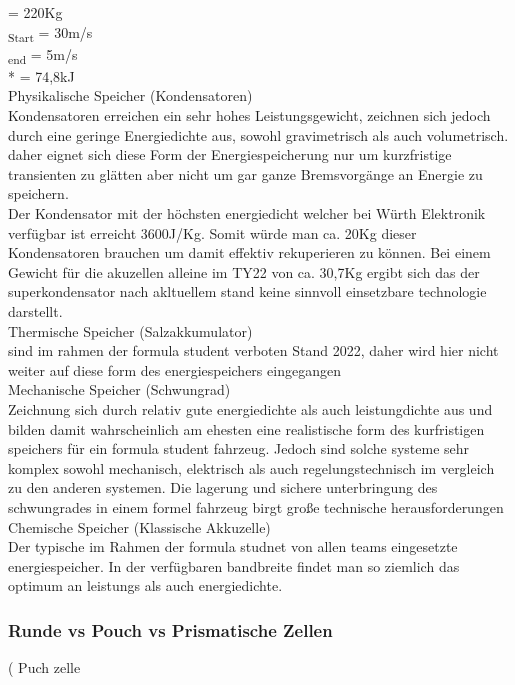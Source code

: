  = 220Kg
\\
\textsubscript{Start} = 30m/s
\\
\textsubscript{end} = 5m/s
\\
 *  = 74,8kJ
\\

Physikalische Speicher (Kondensatoren)
\\
	Kondensatoren erreichen ein sehr hohes Leistungsgewicht, zeichnen sich jedoch durch eine geringe Energiedichte aus, sowohl gravimetrisch als auch volumetrisch. daher eignet sich diese Form der Energiespeicherung nur um kurzfristige transienten zu glätten aber nicht um gar ganze Bremsvorgänge an Energie zu speichern.\\
	Der Kondensator mit der höchsten energiedicht welcher bei Würth Elektronik verfügbar ist erreicht 3600J/Kg. Somit würde man ca. 20Kg dieser Kondensatoren brauchen um damit effektiv rekuperieren zu können. Bei einem Gewicht für die akuzellen alleine im TY22 von ca. 30,7Kg ergibt sich das der superkondensator nach akltuellem stand keine sinnvoll einsetzbare technologie darstellt.
\\
Thermische Speicher (Salzakkumulator)
\\
	sind im rahmen der formula student verboten Stand 2022, daher wird hier nicht weiter auf diese form des energiespeichers eingegangen
\\
Mechanische Speicher (Schwungrad)
\\
	Zeichnung sich durch relativ gute energiedichte als auch leistungdichte aus und bilden damit wahrscheinlich am ehesten eine realistische form des kurfristigen speichers für ein formula student fahrzeug. Jedoch sind solche systeme sehr komplex sowohl mechanisch, elektrisch als auch regelungstechnisch im vergleich zu den anderen systemen. Die lagerung und sichere unterbringung des schwungrades in einem formel fahrzeug birgt große technische herausforderungen
\\
Chemische Speicher (Klassische Akkuzelle)
\\
	Der typische im Rahmen der formula studnet von allen teams eingesetzte energiespeicher. In der verfügbaren bandbreite findet man so ziemlich das optimum an leistungs als auch energiedichte.
\FloatBarrier
\subsubsection{Runde vs Pouch vs Prismatische Zellen}
(
	Puch zelle

